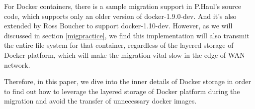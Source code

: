 For Docker containers, there is a sample migration support in P.Haul's source code, which supports only an older version of docker-1.9.0-dev. And it's also extended by Ross Boucher to support docker-1.10-dev. However, as we will discussed in section \ref{migpractice}, we find this implementation will also transmit the entire file system for that container, regardless of the layered storage of Docker platform, which will make the migration vital slow in the edge of WAN network. 

Therefore, in this paper, we dive into the inner details of Docker storage in order to find out how to leverage the layered storage of Docker platform during the migration and avoid the transfer of unnecessary docker images. 


